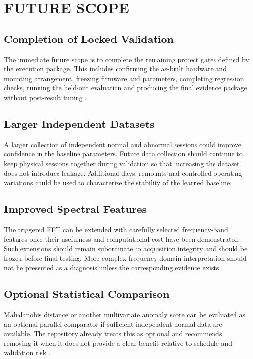 \chapter{FUTURE SCOPE}

\section{Completion of Locked Validation}
\hspace{2em}The immediate future scope is to complete the remaining project gates defined by the execution package. This includes confirming the as-built hardware and mounting arrangement, freezing firmware and parameters, completing regression checks, running the held-out evaluation and producing the final evidence package without post-result tuning \cite{vibeguardplaybook}.

\section{Larger Independent Datasets}
\hspace{2em}A larger collection of independent normal and abnormal sessions could improve confidence in the baseline parameters. Future data collection should continue to keep physical sessions together during validation so that increasing the dataset does not introduce leakage. Additional days, remounts and controlled operating variations could be used to characterize the stability of the learned baseline.

\section{Improved Spectral Features}
\hspace{2em}The triggered FFT can be extended with carefully selected frequency-band features once their usefulness and computational cost have been demonstrated. Such extensions should remain subordinate to acquisition integrity and should be frozen before final testing. More complex frequency-domain interpretation should not be presented as a diagnosis unless the corresponding evidence exists.

\section{Optional Statistical Comparison}
\hspace{2em}Mahalanobis distance or another multivariate anomaly score can be evaluated as an optional parallel comparator if sufficient independent normal data are available. The repository already treats this as optional and recommends removing it when it does not provide a clear benefit relative to schedule and validation risk \cite{vibeguardplaybook}.

